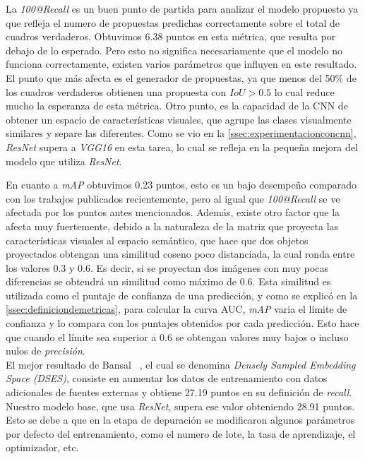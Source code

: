 La \textit{100@Recall} es un buen punto de partida para analizar el modelo propuesto ya que refleja el numero de propuestas predichas correctamente sobre el total de cuadros verdaderos. Obtuvimos 6.38 puntos en esta métrica, que resulta por debajo de lo esperado. Pero esto no significa necesariamente que el modelo no funciona correctamente, existen varios parámetros que influyen en este resultado. El punto que más afecta es el generador de propuestas, ya que menos del 50\% de los cuadros verdaderos obtienen una propuesta con $IoU > 0.5$ lo cual reduce mucho la esperanza de esta métrica. Otro punto, es la capacidad de la CNN de obtener un espacio de características visuales, que agrupe las clases visualmente similares y separe las diferentes. Como se vio en la \autoref{ssec:experimentacionconcnn}, \textit{ResNet} supera a \textit{VGG16} en esta tarea, lo cual se refleja en la pequeña mejora del modelo que utiliza  \textit{ResNet}.

En cuanto a \textit{mAP} obtuvimos 0.23 puntos, esto es un bajo desempeño comparado con los trabajos publicados recientemente, pero al igual que \textit{100@Recall} se ve afectada por los puntos antes mencionados. Además, existe otro factor que la afecta muy fuertemente, debido a la naturaleza de la matriz que proyecta las características visuales al espacio semántico, que hace que dos objetos proyectados obtengan una similitud coseno poco distanciada, la cual ronda entre los valores 0.3 y 0.6. Es decir, si se proyectan dos imágenes con muy pocas diferencias se obtendrá un similitud como máximo de 0.6. Esta similitud es utilizada como el puntaje de confianza de una predicción, y como se explicó en la \autoref{ssec:definiciondemetricas}, para calcular la curva AUC, \textit{mAP} varia el límite de confianza y lo compara con los puntajes obtenidos por cada predicción. Esto hace que cuando el límite sea superior a 0.6 se obtengan valores muy bajos o incluso nulos de \textit{precisión}.\\


El mejor resultado de Bansal \etal~\cite{bansal2018zero}, el cual se denomina \textit{Densely Sampled Embedding Space (DSES)}, consiste en aumentar los datos de entrenamiento con datos adicionales de fuentes externas y obtiene 27.19 puntos en su definición de \textit{recall}. Nuestro modelo base, que usa \textit{ResNet}, supera ese valor obteniendo 28.91 puntos. Esto se debe a que en la etapa de depuración se modificaron algunos parámetros por defecto del entrenamiento, como el numero de lote, la tasa de aprendizaje, el optimizador, etc.  

